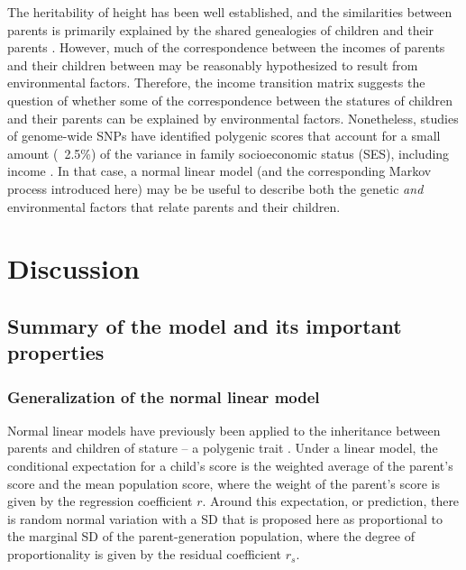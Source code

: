 \documentclass[a4paper,11pt]{article} %
\begin{document}
The heritability of height has been well established, and the similarities between parents is primarily explained by the shared genealogies of children and their parents \cite{luo, preece, wood}. However, much of the correspondence between the incomes of parents and their children between may be reasonably hypothesized to result from environmental factors. Therefore, the income transition matrix suggests the question of whether some of the correspondence between the statures of children and their parents can be explained by environmental factors. Nonetheless, studies of genome-wide SNPs have identified polygenic scores that account for a small amount (~2.5\%) of the variance in family socioeconomic status (SES), including income \cite{trzaskowski, krapohl}. In that case, a normal linear model (and the corresponding Markov process introduced here) may be be useful to describe both the genetic \emph{and} environmental factors that relate parents and their children.



\section{Discussion}

\subsection{Summary of the model and its important properties}

\subsubsection*{Generalization of the normal linear model}

Normal linear models have previously been applied to the inheritance between parents and children of stature -- a polygenic trait \cite{luo}. Under a linear model, the conditional expectation for a child's score is the weighted average of the parent's score and the mean population score, where the weight of the parent's score is given by the regression coefficient $r$. Around this expectation, or prediction, there is random normal variation with a SD that is proposed here as proportional to the marginal SD of the parent-generation population, where the degree of proportionality is given by the residual coefficient $r_s$. 
\end{document}
